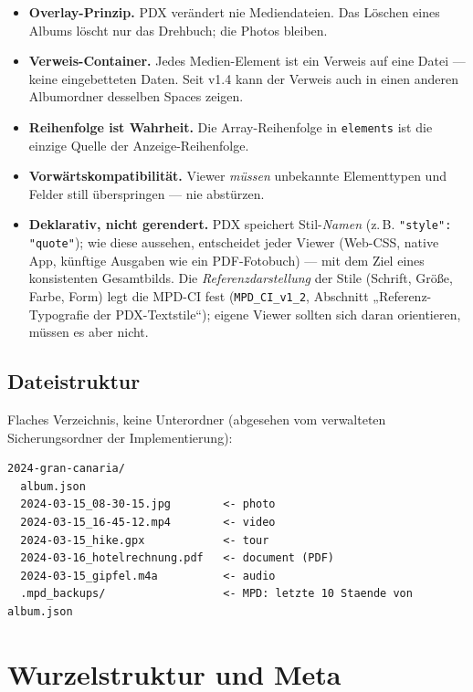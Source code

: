 \documentclass[11pt,a4paper]{article}
\let\mpdtt\texttt
\renewcommand{\texttt}[1]{\mpdtt{\textcolor{mpdred}{#1}}}
\begin{document}
\begin{itemize}
  \item \textbf{Overlay-Prinzip.} PDX verändert nie Mediendateien. Das
        Löschen eines Albums löscht nur das Drehbuch; die Photos bleiben.
  \item \textbf{Verweis-Container.} Jedes Medien-Element ist ein Verweis
        auf eine Datei — keine eingebetteten Daten. Seit v1.4 kann der
        Verweis auch in einen anderen Albumordner desselben Spaces zeigen.
  \item \textbf{Reihenfolge ist Wahrheit.} Die Array-Reihenfolge in
        \texttt{elements} ist die einzige Quelle der Anzeige-Reihenfolge.
  \item \textbf{Vorwärtskompatibilität.} Viewer \emph{müssen} unbekannte
        Elementtypen und Felder still überspringen — nie abstürzen.
  \item \textbf{Deklarativ, nicht gerendert.} PDX speichert Stil-\emph{Namen}
        (z.\,B. \texttt{"style": "quote"}); wie diese aussehen, entscheidet
        jeder Viewer (Web-CSS, native App, künftige Ausgaben wie ein
        PDF-Fotobuch) — mit dem Ziel eines konsistenten Gesamtbilds.
        Die \emph{Referenzdarstellung} der Stile (Schrift, Größe, Farbe,
        Form) legt die MPD-CI fest (\texttt{MPD\_CI\_v1\_2}, Abschnitt
        „Referenz-Typografie der PDX-Textstile“); eigene Viewer sollten
        sich daran orientieren, müssen es aber nicht.
\end{itemize}

\subsection{Dateistruktur}

Flaches Verzeichnis, keine Unterordner (abgesehen vom verwalteten
Sicherungsordner der Implementierung):

\begin{lstlisting}[language={}]
2024-gran-canaria/
  album.json
  2024-03-15_08-30-15.jpg        <- photo
  2024-03-15_16-45-12.mp4        <- video
  2024-03-15_hike.gpx            <- tour
  2024-03-16_hotelrechnung.pdf   <- document (PDF)
  2024-03-15_gipfel.m4a          <- audio
  .mpd_backups/                  <- MPD: letzte 10 Staende von album.json
\end{lstlisting}

\section{Wurzelstruktur und Meta}
\end{document}

